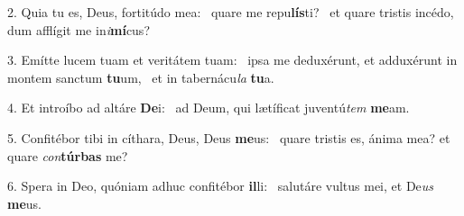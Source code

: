 2. Quia tu es, Deus, fortitúdo mea: \dag\  quare me repu\textbf{lís}ti? \ast\  et quare tristis incédo, dum afflígit me in\textit{i}\textbf{mí}cus?\

3. Emítte lucem tuam et veritátem tuam: \dag\  ipsa me deduxérunt, et adduxérunt in montem sanctum \textbf{tu}um, \ast\  et in tabernácu\textit{la} \textbf{tu}a.\

4. Et introíbo ad altáre \textbf{De}i: \ast\  ad Deum, qui lætíficat juventú\textit{tem} \textbf{me}am.\

5. Confitébor tibi in cíthara, Deus, Deus \textbf{me}us: \ast\  quare tristis es, ánima mea? et quare \textit{con}\textbf{túr}\textbf{bas} me?\

6. Spera in Deo, quóniam adhuc confitébor \textbf{il}li: \ast\  salutáre vultus mei, et De\textit{us} \textbf{me}us.\


